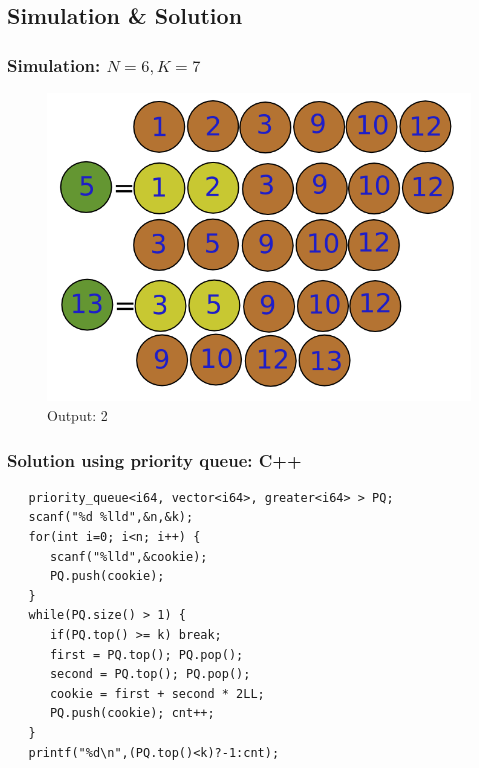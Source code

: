 \documentclass{beamer}
\begin{document}
\subsection{Simulation \& Solution}
\begin{frame}
\frametitle{ Simulation: $N=6, K=7$ }
\begin{figure}
	\includegraphics[width=0.5\linewidth]{cookie.png}
	\caption{Output: 2}
\end{figure}
\end{frame}
\begin{frame}[fragile]
\frametitle{ Solution using priority queue: C++ }
\begin{example}[ C++ Implementation ]
\begin{lstlisting}
   priority_queue<i64, vector<i64>, greater<i64> > PQ;
   scanf("%d %lld",&n,&k);
   for(int i=0; i<n; i++) {
      scanf("%lld",&cookie);
      PQ.push(cookie);
   }
   while(PQ.size() > 1) {
      if(PQ.top() >= k) break;
      first = PQ.top(); PQ.pop();
      second = PQ.top(); PQ.pop();
      cookie = first + second * 2LL;
      PQ.push(cookie); cnt++;
   }
   printf("%d\n",(PQ.top()<k)?-1:cnt);
\end{lstlisting}
\end{example}
\end{frame}
\end{document}
